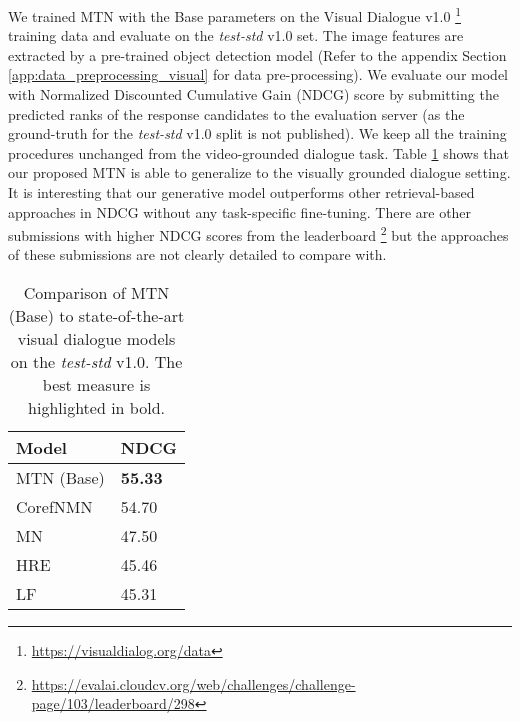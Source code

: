 \documentclass[11pt,a4paper]{article}
\begin{document}
We trained MTN with the Base parameters on the Visual Dialogue v1.0 \footnote{\url{https://visualdialog.org/data}} training data and evaluate on the \textit{test-std} v1.0 set. The image features are extracted by a pre-trained object detection model (Refer to the appendix Section \ref{app:data_preprocessing_visual} for data pre-processing).  
We evaluate our model with Normalized Discounted Cumulative Gain (NDCG) score by submitting the predicted ranks of the response candidates to the evaluation server (as the ground-truth for the \textit{test-std} v1.0 split is not published). We keep all the training procedures unchanged from the video-grounded dialogue task. Table \ref{tab:result_vis} shows that our proposed MTN is able to generalize to the visually grounded dialogue setting. It is interesting that our generative model outperforms other retrieval-based approaches in NDCG without any task-specific fine-tuning. There are other submissions with higher NDCG scores from the leaderboard \footnote{\url{https://evalai.cloudcv.org/web/challenges/challenge-page/103/leaderboard/298}} but the approaches of these submissions are not clearly detailed to compare with. 


\begin{table}[htbp]
\centering
\begin{tabular}{ll}
\hline
\textbf{Model} & \textbf{NDCG} \\ \hline
MTN (Base)           & \textbf{55.33}         \\ \hline
CorefNMN \cite{kottur2018visual}       & 54.70         \\ 
MN \cite{das2017visual}            & 47.50         \\ 
HRE \cite{das2017visual}         & 45.46         \\ 
LF \cite{das2017visual}            & 45.31         \\ \hline
\end{tabular}
\caption{Comparison of MTN (Base) to state-of-the-art visual dialogue models on the \textit{test-std} v1.0.  The best measure is highlighted in bold.}
\label{tab:result_vis}
\end{table}
\end{document}
